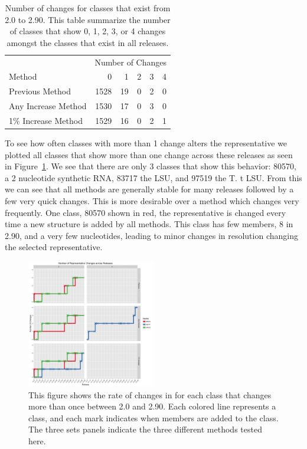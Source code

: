 \begin{table}
  \begin{tabular}{lrrrrr}
    \toprule
                        & \multicolumn{5}{c}{Number of Changes} \\
                          \cmidrule(r){2-6}
    Method              & 0    & 1  &  2 &  3 &  4 \\
    \midrule
    Previous Method     & 1528 & 19 &  0 &  2 &  0 \\
    Any Increase Method & 1530 & 17 &  0 &  3 &  0 \\
    1\% Increase Method & 1529 & 16 &  0 &  2 &  1 \\
    \bottomrule
  \end{tabular}
  \caption{Number of changes for classes that exist from 2.0 to 2.90. This table
    summarize the number of classes that show 0, 1, 2, 3, or 4 changes amongst
  the classes that exist in all releases. }
\label{tab:rep-changes-count}
\end{table}

To see how often classes with more than 1 change alters the representative we
plotted all classes that show more than one change across these releases as seen
in Figure~\ref{fig:multi-change}. We see that there are only 3 classes that show
this behavior: 80570, a 2 nucleotide synthetic RNA, 83717 the \EC{} LSU, and
97519 the T\@. t LSU\@. From this we can see that all methods are generally stable
for many releases followed by a few very quick changes. This is more
desirable over a method which changes very frequently. One class, 80570
shown in red, the representative is changed every time a new structure is
added by all methods. This class has few members, 8 in 2.90, and a very
few nucleotides, leading to minor changes in resolution changing the
selected representative. 

\begin{figure}
  \includegraphics[width=0.5\textwidth]{chapter-4/figs/change-frequency}
  \caption{This figure shows the rate of changes in for each class that changes
    more than once between 2.0 and 2.90. Each colored line represents a class,
    and each mark indicates when members are added to the class. The three sets
  panels indicate the three different methods tested here.}
\label{fig:multi-change}
\end{figure}

